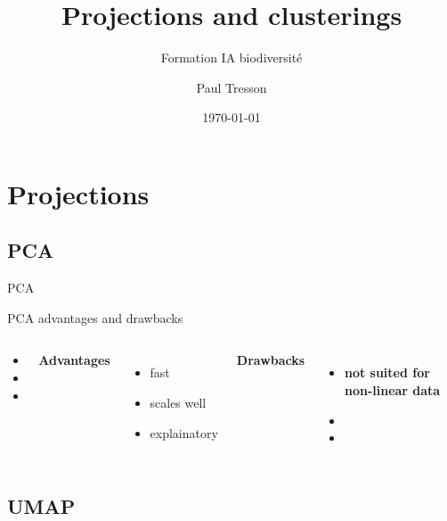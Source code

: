 \documentclass{irdbeamer}
\title{Projections and clusterings}
\subtitle{Formation IA biodiversité}
\author[Paul Tresson]{Paul Tresson}
\date{\today} %
\institute[Institut de Recherche pour le Développement]{UMR AMAP}
\begin{document}
\maketitle

\usebackgroundtemplate{}

\section{Projections}
\subsection{PCA}
\begin{frame}{PCA}

\end{frame}

\begin{frame}{PCA advantages and drawbacks}
\begin{columns}
\begin{column}{0.05\textwidth}
\begin{itemize}
    \item[] 
    \item[] 
    \item[] 
\end{itemize}
\end{column}
        \textbf{Advantages}
        \begin{itemize}
            \item<1-> fast
            \item<2-> scales well
            \item<3-> explainatory
        \end{itemize}
        \textbf{Drawbacks}
        \begin{itemize}
            \item<4-> \textbf{not suited for non-linear data}
            \item[] 
            \item[] 
        \end{itemize}
\end{columns}

\end{frame}


\subsection{UMAP}
\end{document}

